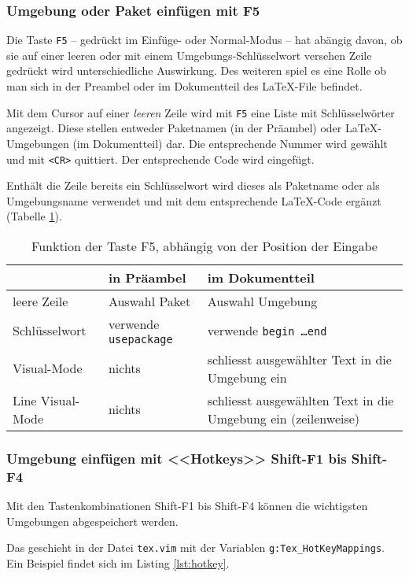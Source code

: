 \documentclass[a4paper,parskip=half,draft=true,DIV=15]{scrartcl}
\begin{document}
\subsubsection{Umgebung oder Paket einfügen mit F5}
\label{sec:methodpressingffife}

Die Taste \texttt{F5} -- gedrückt im Einfüge- oder Normal-Modus
-- hat abängig davon, ob sie auf einer leeren oder mit einem
Umgebungs-Schlüsselwort versehen Zeile gedrückt wird unterschiedliche
Auswirkung. Des weiteren spiel es eine Rolle ob man sich in der Preambel oder
im Dokumentteil des LaTeX-File befindet.

Mit dem Cursor auf einer \emph{leeren} Zeile wird mit \texttt{F5} eine Liste mit
Schlüsselwörter angezeigt. Diese stellen entweder Paketnamen (in der
Präambel) oder LaTeX-Umgebungen (im Dokumentteil) dar. Die entsprechende
Nummer wird gewählt und mit \texttt{<CR>} quittiert. Der entsprechende Code
wird eingefügt.

Enthält die Zeile bereits ein Schlüsselwort wird dieses als Paketname oder
als Umgebungsname verwendet und mit dem entsprechende LaTeX-Code ergänzt
(Tabelle \ref{tab:tasteffuenf}).

\begin{table}
  \centering
  \begin{tabular}{l|ll}
    \hline
    		& in Präambel & im Dokumentteil \\
	\hline
	leere Zeile & Auswahl Paket & Auswahl Umgebung\\
	Schlüsselwort & verwende \texttt{usepackage} & verwende \texttt{begin \dots end}\\
	Visual-Mode & nichts & schliesst ausgewählter Text in die Umgebung ein\\
	Line Visual-Mode & nichts & schliesst ausgewählten Text in die Umgebung ein (zeilenweise) \\
  \hline
      \end{tabular}
  \caption{Funktion der Taste F5, abhängig von der Position der Eingabe}
  \label{tab:tasteffuenf}
\end{table}

\subsubsection{Umgebung einfügen mit <<Hotkeys>> Shift-F1 bis Shift-F4}

Mit den Tastenkombinationen Shift-F1 bis Shift-F4 können die wichtigsten Umgebungen
abgespeichert werden.

Das geschieht in der Datei \texttt{tex.vim} mit der Variablen \texttt{g:Tex\_HotKeyMappings}.
Ein Beispiel findet sich im Listing \ref{lst:hotkey}.
\end{document}

